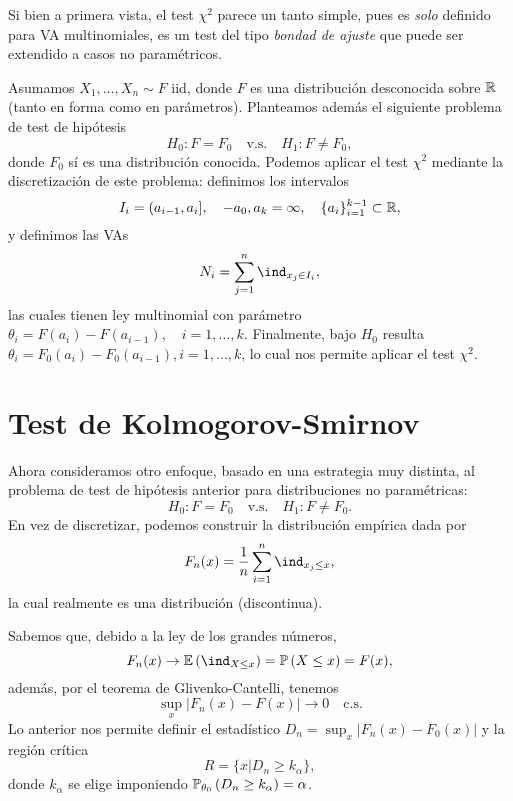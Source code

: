 Si bien a primera vista, el test $\chi^2$ parece un tanto simple, pues es \emph{solo} definido para VA multinomiales, es un test del tipo \emph{bondad de ajuste} que puede ser extendido a casos no paramétricos.


Asumamos $X_1,\ldots,X_n\sim F$ iid, donde $F$ es una distribución desconocida sobre ${\mathbb R}$ (tanto en forma como en parámetros). Planteamos además el siguiente problema de test de hipótesis
	\begin{equation}
		H_0:F=F_0\quad \text{v.s.}\quad H_1:F\neq F_0,
	\end{equation}
	donde $F_0$ sí es una distribución conocida. 
Podemos aplicar el test $\chi^2$ mediante la discretización de este problema: definimos los intervalos
\begin{equation}
 	I_i = (a_{i-1},a_i],\quad -a_0,a_k = \infty, \quad \{a_i\}_{i=1}^{k-1}\subset{\mathbb R},
 \end{equation} 
 y definimos las VAs
 \begin{equation}
 	N_i = \sum_{j=1}^n \ind_{x_j\in I_i},
 \end{equation}
 las cuales tienen ley multinomial con parámetro $\theta_i = F(a_i)- F(a_{i-1}),\quad i=1,\ldots,k$. Finalmente, bajo $H_0$ resulta $\theta_i = F_0(a_i)- F_0(a_{i-1}), i=1,\ldots,k$, lo cual nos permite aplicar el test $\chi^2$.


 \section{Test de Kolmogorov-Smirnov} 
\label{sub:test_KS}

Ahora consideramos otro enfoque, basado en una estrategia muy distinta, al problema de test de hipótesis anterior para distribuciones no paramétricas:
	\begin{equation}
		H_0:F=F_0\quad \text{v.s.}\quad H_1:F\neq F_0.
	\end{equation}
En vez de discretizar, podemos construir la distribución empírica dada por 
\begin{equation}
	F_n(x) = \frac{1}{n}\sum_{i=1}^n\ind_{x_j\leq x}, 
\end{equation}
la cual realmente es una distribución (discontinua). 

Sabemos que, debido a la ley de los grandes números, 
\begin{equation}
	F_n(x)\to \E{\ind_{X\leq x}} = \Prob{X\leq x} =  F(x),
\end{equation}
además, por el teorema de Glivenko-Cantelli, tenemos 
\begin{equation}
	\sup_x|F_n(x)-F(x)| \to 0 \quad\text{c.s.}
\end{equation}
Lo anterior nos permite definir el estadístico  $D_n = \sup_x|F_n(x)-F_0(x)|$ y la región crítica
\begin{equation}
	R = \{x|D_n\geq k_\alpha\},
\end{equation}
donde $k_\alpha$ se elige imponiendo $\mathbb{P}_{\theta_0} \left(D_n\geq  k_\alpha\right)=\alpha$.


